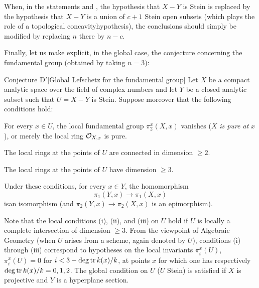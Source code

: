\begin{remarquestar}
When, in the statements  and , the hypothesis that $X-Y$ is Stein is replaced by the hypothesis that $X-Y$ is a union of $c+1$ Stein open subsets (which plays the role of a topological \og concavity\fg hypothesis), the conclusions should simply be modified by replacing $n$ there by $n-c$.
\end{remarquestar}

Finally, let us make explicit, in the \og global case\fg {}, the conjecture concerning the fundamental group (obtained by taking $n=3$):

\label{XIII.6.D'}
\begin{enonce*}{Conjecture D$\boldsymbol'$}[Global Lefschetz for the fundamental group]
Let $X$ be a compact analytic space over the field of complex numbers and let $Y$ be a closed analytic subset such that $U=X-Y$ is Stein. Suppose moreover that the following conditions hold:
\begin{enumeratei}
\item
For every $x\in U$, the local fundamental group $\pi_2^x(X,x)$ vanishes (\ie $X$ \emph{is \og pure at }$x$\fg), or merely the local ring $\mathcal O_{X,x}$ is pure.
\item
The local rings at the points of $U$ are \og connected in dimension $\geq 2$\fg.
\item
The local rings at the points of $U$ have dimension $\geq 3$.
\end{enumeratei}

Under these conditions, for every $x\in Y$, the homomorphism
$$
\pi_1(Y,x)\to\pi_1(X,x)
$$
is\pageoriginale an isomorphism (and $\pi_2(Y,x)\to\pi_2(X,x)$ is an epimorphism).
\end{enonce*}

Note that the local conditions (i), (ii), and (iii) on $U$ hold if $U$ is locally a complete intersection of dimension $\geq 3$. From the viewpoint of Algebraic Geometry (when $U$ arises from a scheme, again denoted by $U$), conditions (i) through (iii) correspond to hypotheses on the local invariants $\pi_i^x(U)$,  \hbox{$\pi_i^x(U)=0$} for $i<3-\operatorname{deg\,tr} k(x)/k$, at points $x$ for which one has respectively $\operatorname{deg\,tr} k(x)/k=0,1,2$. The global condition on $U$ ($U$ Stein) is satisfied if $X$ is projective and $Y$ is a hyperplane section.

